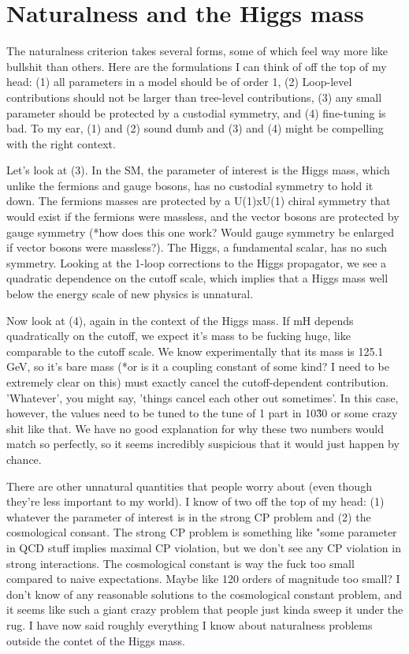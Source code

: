 \documentclass[12pt]{article}
\begin{document}
\section{Naturalness and the Higgs mass}
    The naturalness criterion takes several forms, some of which feel way more like bullshit than others. Here are the formulations I can think of off the top of my head: (1) all parameters in a model should be of order 1, (2) Loop-level contributions should not be larger than tree-level contributions, (3) any small parameter should be protected by a custodial symmetry, and (4) fine-tuning is bad. To my ear, (1) and (2) sound dumb and (3) and (4) might be compelling with the right context.

    Let's look at (3). In the SM, the parameter of interest is the Higgs mass, which unlike the fermions and gauge bosons, has no custodial symmetry to hold it down. The fermions masses are protected by a U(1)xU(1) chiral symmetry that would exist if the fermions were massless, and the vector bosons are protected by gauge symmetry (*how does this one work? Would gauge symmetry be enlarged if vector bosons were massless?). The Higgs, a fundamental scalar, has no such symmetry. Looking at the 1-loop corrections to the Higgs propagator, we see a quadratic dependence on the cutoff scale, which implies that a Higgs mass well below the energy scale of new physics is unnatural.

    Now look at (4), again in the context of the Higgs mass. If mH depends quadratically on the cutoff, we expect it's mass to be fucking huge, like comparable to the cutoff scale. We know experimentally that its mass is 125.1 GeV, so it's bare mass (*or is it a coupling constant of some kind? I need to be extremely clear on this) must exactly cancel the cutoff-dependent contribution. 'Whatever', you might say, 'things cancel each other out sometimes'. In this case, however, the values need to be tuned to the tune of 1 part in 10\^30 or some crazy shit like that. We have no good explanation for why these two numbers would match so perfectly, so it seems incredibly suspicious that it would just happen by chance.

    There are other unnatural quantities that people worry about (even though they're less important to my world). I know of two off the top of my head: (1) whatever the parameter of interest is in the strong CP problem and (2) the cosmological consant. The strong CP problem is something like "some parameter in QCD stuff implies maximal CP violation, but we don't see any CP violation in strong interactions. The cosmological constant is way the fuck too small compared to naive expectations. Maybe like 120 orders of magnitude too small? I don't know of any reasonable solutions to the cosmological constant problem, and it seems like such a giant crazy problem that people just kinda sweep it under the rug. I have now said roughly everything I know about naturalness problems outside the contet of the Higgs mass.
    
\end{document}
